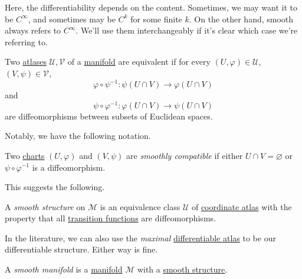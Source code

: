 \begin{remark}
	Here, the differentiability depends on the content. Sometimes, we may want it to be \(C^{\infty} \), and sometimes may be \(C^k\) for some finite \(k\). On the other hand, smooth always refers to \(C^{\infty} \). We'll use them interchangeably if it's clear which case we're referring to.
\end{remark}

\begin{definition}\label{def:equivalence-atlas}
	Two \hyperref[def:atlas]{atlases} \(\mathcal{U} , \mathcal{V} \) of a \hyperref[def:topological-manifold]{manifold} are equivalent if for every \((U, \varphi)\in \mathcal{U} \), \((V, \psi)\in \mathcal{V} \),
	\[
		\varphi \circ \psi ^{-1} \colon \psi(U \cap V) \to \varphi (U \cap V)
	\]
	and
	\[
		\psi \circ \varphi ^{-1} \colon \varphi (U \cap V) \to \psi(U \cap V)
	\]
	are diffeomorphisms between subsets of Euclidean spaces.
\end{definition}

Notably, we have the following notation.

\begin{notation}\label{not:smoothly-compatible}
	Two \hyperref[def:coordinate-chart]{charts} \((U, \varphi )\) and \((V, \psi)\) are \emph{smoothly compatible} if either \(U \cap V = \varnothing \) or \(\psi \circ \varphi ^{-1} \) is a diffeomorphism.
\end{notation}

This suggests the following.

\begin{definition}\label{def:smooth-structure}
	A \emph{smooth structure} on \(\mathcal{M} \) is an equivalence class \(\mathcal{U} \) of \hyperref[def:atlas]{coordinate atlas} with the property that all \hyperref[def:coordinate-transition]{transition functions} are diffeomorphisms.
\end{definition}

\begin{remark}
	In the literature, we can also use the \emph{maximal} \hyperref[def:differentiable-atlas]{differentiable atlas} to be our differentiable structure. Either way is fine.
\end{remark}

\begin{definition}\label{def:smooth-manifold}
	A \emph{smooth manifold} is a \hyperref[def:topological-manifold]{manifold} \(\mathcal{M} \) with a \hyperref[def:smooth-structure]{smooth structure}.
\end{definition}

